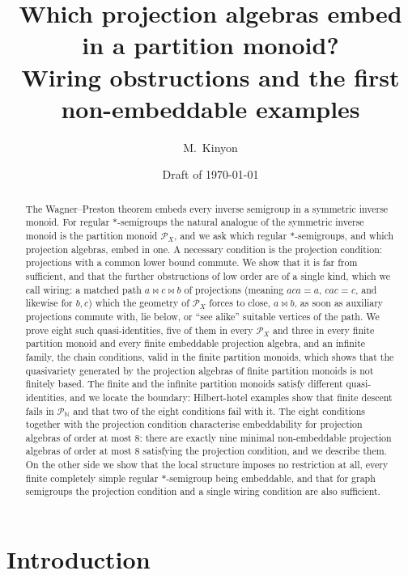 \documentclass[11pt]{amsart}
\title[Embedding projection algebras in partition monoids]{Which projection algebras embed in a partition monoid?\\ Wiring obstructions and the first non-embeddable examples}
\author{M.~Kinyon}
\date{Draft of \today}
\theoremstyle{definition}
\renewcommand{\P}{\mathcal{P}}      %
\newcommand{\mt}{\bowtie}      %
\begin{document}
\begin{abstract}
The Wagner--Preston theorem embeds every inverse semigroup in a symmetric inverse monoid. For regular $*$-semigroups the natural analogue of the symmetric inverse monoid is the partition monoid $\P_X$, and we ask which regular $*$-semigroups, and which projection algebras, embed in one. A necessary condition is the projection condition: projections with a common lower bound commute. We show that it is far from sufficient, and that the further obstructions of low order are of a single kind, which we call wiring: a matched path $a\mt c\mt b$ of projections (meaning $aca=a$, $cac=c$, and likewise for $b,c$) which the geometry of $\P_X$ forces to close, $a\mt b$, as soon as auxiliary projections commute with, lie below, or ``see alike'' suitable vertices of the path. We prove eight such quasi-identities, five of them in every $\P_X$ and three in every finite partition monoid and every finite embeddable projection algebra, and an infinite family, the chain conditions, valid in the finite partition monoids, which shows that the quasivariety generated by the projection algebras of finite partition monoids is not finitely based. The finite and the infinite partition monoids satisfy different quasi-identities, and we locate the boundary: Hilbert-hotel examples show that finite descent fails in $\P_{\mathbb N}$ and that two of the eight conditions fail with it. The eight conditions together with the projection condition characterise embeddability for projection algebras of order at most $8$: there are exactly nine minimal non-embeddable projection algebras of order at most $8$ satisfying the projection condition, and we describe them. On the other side we show that the local structure imposes no restriction at all, every finite completely simple regular $*$-semigroup being embeddable, and that for graph semigroups the projection condition and a single wiring condition are also sufficient.
\end{abstract}

\maketitle

\tableofcontents

\section{Introduction}\label{sec:intro}
\end{document}
